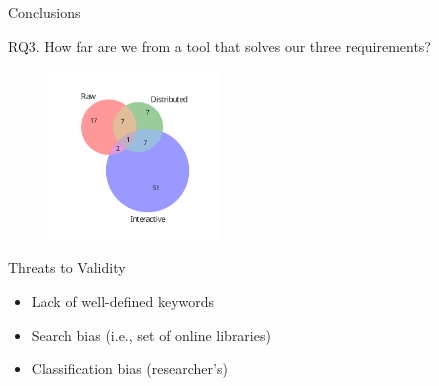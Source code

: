 \documentclass[10pt]{beamer}
\begin{document}
\begin{frame}{Conclusions}
    \begin{block}{RQ3. How far are we from a tool that solves our three requirements?}
        \begin{figure}
            \centering
            \includegraphics[width=0.4\textwidth]{venn.pdf}
        \end{figure}
        \cite{Han2017}
    \end{block}

\end{frame}

\begin{frame}{Threats to Validity}
\begin{itemize}
    \item Lack of well-defined keywords
    \item Search bias (i.e., set of online libraries)
    \item Classification bias (researcher's)
\end{itemize}
\end{frame}
\end{document}
